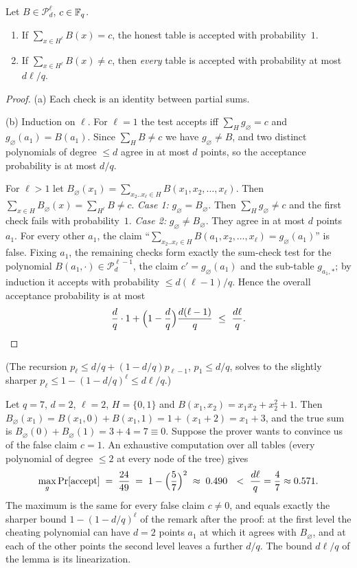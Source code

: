 \begin{lemma}\label{lem:sumcheck}
Let $B\in\mathcal P^\ell_d$, $c\in\mathbb{F}_q$.
\begin{enumerate}[label=(\alph*)]
  \item If $\sum_{x\in H^\ell}B(x)=c$, the honest table is accepted with probability~$1$.
  \item If $\sum_{x\in H^\ell}B(x)\ne c$, then \emph{every} table is accepted with probability at most $d\ell/q$.
\end{enumerate}
\end{lemma}
\begin{proof}
(a) Each check is an identity between partial sums.

(b) Induction on $\ell$.  For $\ell=1$ the test accepts iff $\sum_Hg_\varnothing=c$ and $g_\varnothing(a_1)=B(a_1)$.  Since $\sum_HB\ne c$ we have $g_\varnothing\ne B$, and two distinct polynomials of
degree $\le d$ agree in at most $d$ points, so the acceptance probability is at most $d/q$.

For $\ell>1$ let $B_\varnothing(x_1)=\sum_{x_2..x_\ell\in H}B(x_1,x_2,\dots,x_\ell)$.  Then $\sum_{x\in H}B_\varnothing(x)=\sum_{H^\ell}B\ne c$.
\emph{Case 1:} $g_\varnothing=B_\varnothing$.  Then $\sum_Hg_\varnothing\ne c$ and the first check fails with probability~$1$.
\emph{Case 2:} $g_\varnothing\ne B_\varnothing$.  They agree in at most $d$ points $a_1$.  For every other $a_1$, the claim ``$\sum_{x_2..x_\ell\in H}B(a_1,x_2,\dots,x_\ell)=g_\varnothing(a_1)$'' is
false.  Fixing $a_1$, the remaining checks form exactly the sum-check test for the polynomial $B(a_1,\cdot)\in\mathcal P^{\ell-1}_d$, the claim $c'=g_\varnothing(a_1)$ and the sub-table $g_{a_1,\ast}$;
by induction it accepts with probability $\le d(\ell-1)/q$.  Hence the overall acceptance probability is at most
\[
  \frac dq\cdot1+\Bigl(1-\frac dq\Bigr)\frac{d(\ell-1)}q\ \le\ \frac{d\ell}q.\qedhere
\]
\end{proof}

\noindent
(The recursion $p_\ell\le d/q+(1-d/q)p_{\ell-1}$, $p_1\le d/q$, solves to the slightly sharper $p_\ell\le1-(1-d/q)^\ell\le d\ell/q$.)

\begin{example}\label{ex:sc}
Let $q=7$, $d=2$, $\ell=2$, $H=\{0,1\}$ and $B(x_1,x_2)=x_1x_2+x_2^2+1$.  Then
$B_\varnothing(x_1)=B(x_1,0)+B(x_1,1)=1+(x_1+2)=x_1+3$, and the true sum is $B_\varnothing(0)+B_\varnothing(1)=3+4=7\equiv0$.
Suppose the prover wants to convince us of the false claim $c=1$.  An exhaustive computation over all tables (every polynomial of degree $\le2$ at every node of the tree) gives
\[
  \max_g\Pr[\text{accept}]\;=\;\frac{24}{49}\;=\;1-\Bigl(\frac57\Bigr)^2\;\approx\;0.490\ \ <\ \frac{d\ell}q=\frac47\approx0.571 .
\]
The maximum is the same for every false claim $c\ne0$, and equals exactly the sharper bound $1-(1-d/q)^\ell$ of the remark after the proof: at the first level the cheating polynomial can have
$d=2$ points $a_1$ at which it agrees with $B_\varnothing$, and at each of the other points the second level leaves a further $d/q$.  The bound $d\ell/q$ of the lemma is its linearization.
\end{example}

